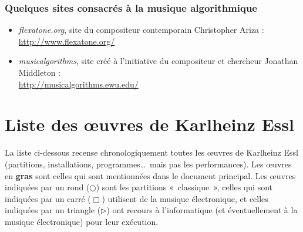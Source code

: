 \documentclass[a4paper,12pt]{article}
\newcommand{\guill}[1]{«~#1~»}
\begin{document}
\subsubsection*{Quelques sites consacrés à la musique algorithmique}

\begin{itemize}
\item \emph{flexatone.org}, site du compositeur contemporain Christopher Ariza : \\ \href{http://www.flexatone.org/}{http://www.flexatone.org/}
\item \emph{musicalgorithms}, site créé à l'initiative du compositeur et chercheur Jonathan Middleton : \\ \href{http://musicalgorithms.ewu.edu/}{http://musicalgorithms.ewu.edu/}
\end{itemize}

\newpage
\section{Liste des œuvres de Karlheinz Essl}

La liste ci-dessous recense chronologiquement toutes les œuvres de Karlheinz Essl (partitions, installations, programmes\dots~mais pas les performances). Les œuvres en \textbf{gras} sont celles qui sont mentionnées dans le document principal. Les œuvres indiquées par un rond ($\bigcirc$) sont les partitions \guill{classique}, celles qui sont indiquées par un carré ($\Box$) utilisent de la musique électronique, et celles indiquées par un triangle ($\rhd$) ont recours à l'informatique (et éventuellement à la musique électronique) pour leur exécution.
\end{document}
